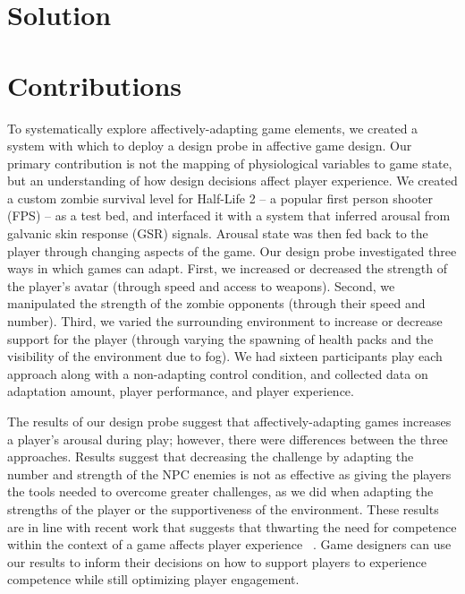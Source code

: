 \section{Solution}



\section{Contributions}

To systematically explore affectively-adapting game elements, we created a system with which to deploy a design probe in affective game design. Our primary contribution is not the mapping of physiological variables to game state, but an understanding of how design decisions affect player experience. We created a custom zombie survival level for Half-Life 2 – a popular first person shooter (FPS) – as a test bed, and interfaced it with a system that inferred arousal from galvanic skin response (GSR) signals. Arousal state was then fed back to the player through changing aspects of the game. Our design probe investigated three ways in which games can adapt. First, we increased or decreased the strength of the player’s avatar (through speed and access to weapons). Second, we manipulated the strength of the zombie opponents (through their speed and number). Third, we varied the surrounding environment to increase or decrease support for the player (through varying the spawning of health packs and the visibility of the environment due to fog). We had sixteen participants play each approach along with a non-adapting control condition, and collected data on adaptation amount, player performance, and player experience.

The results of our design probe suggest that affectively-adapting games increases a player’s arousal during play; however, there were differences between the three approaches. Results suggest that decreasing the challenge by adapting the number and strength of the NPC enemies is not as effective as giving the players the tools needed to overcome greater challenges, as we did when adapting the strengths of the player or the supportiveness of the environment. These results are in line with recent work that suggests that thwarting the need for competence within the context of a game affects player experience ~\cite{przybylski2013competence}. Game designers can use our results to inform their decisions on how to support players to experience competence while still optimizing player engagement.

